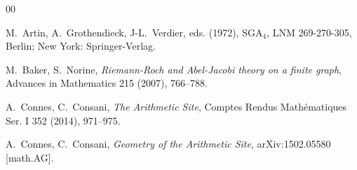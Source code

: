 \documentclass{elsart3-1}
\def\F{{\mathbb F}}
\begin{document}
\begin{thebibliography}{00}



 M.~Artin, A.~Grothendieck, J-L.~Verdier, eds. (1972), SGA$_4$,  LNM 269-270-305, Berlin; New York: Springer-Verlag.

 M.~Baker, S.~Norine, {\em Riemann-Roch and Abel-Jacobi theory on a finite graph},  Advances in Mathematics 215 (2007), 766--788.



 



 A.~Connes, C.~Consani, {\em The Arithmetic Site}, Comptes Rendus Math\' ematiques Ser. I 352 (2014), 971--975.  

 A.~Connes, C.~Consani, {\em Geometry of the Arithmetic Site}, arXiv:1502.05580 [math.AG].







\end{thebibliography}
\end{document}
